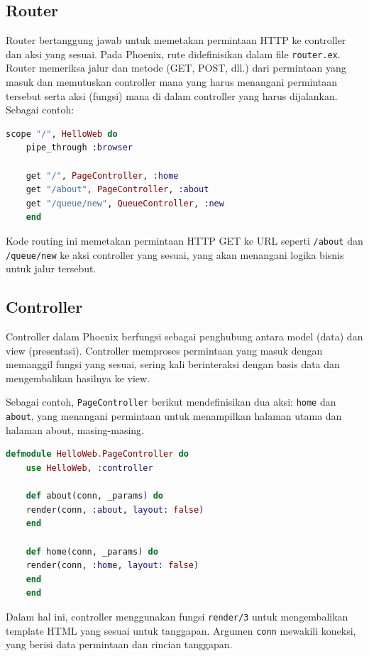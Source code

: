 \subsection{Router}
Router bertanggung jawab untuk memetakan permintaan HTTP ke controller dan aksi yang sesuai. Pada Phoenix, rute didefinisikan dalam file \texttt{router.ex}. Router memeriksa jalur dan metode (GET, POST, dll.) dari permintaan yang masuk dan memutuskan controller mana yang harus menangani permintaan tersebut serta aksi (fungsi) mana di dalam controller yang harus dijalankan. Sebagai contoh:

\begin{lstlisting}[language=Elixir]
	scope "/", HelloWeb do
	pipe_through :browser
	
	get "/", PageController, :home
	get "/about", PageController, :about
	get "/queue/new", QueueController, :new
	end
\end{lstlisting}

Kode routing ini memetakan permintaan HTTP GET ke URL seperti \texttt{/about} dan \texttt{/queue/new} ke aksi controller yang sesuai, yang akan menangani logika bisnis untuk jalur tersebut.

\subsection{Controller}
Controller dalam Phoenix berfungsi sebagai penghubung antara model (data) dan view (presentasi). Controller memproses permintaan yang masuk dengan memanggil fungsi yang sesuai, sering kali berinteraksi dengan basis data dan mengembalikan hasilnya ke view.

Sebagai contoh, \texttt{PageController} berikut mendefinisikan dua aksi: \texttt{home} dan \texttt{about}, yang menangani permintaan untuk menampilkan halaman utama dan halaman about, masing-masing.

\begin{lstlisting}[language=Elixir]
	defmodule HelloWeb.PageController do
	use HelloWeb, :controller
	
	def about(conn, _params) do
	render(conn, :about, layout: false)
	end
	
	def home(conn, _params) do
	render(conn, :home, layout: false)
	end
	end
\end{lstlisting}

Dalam hal ini, controller menggunakan fungsi \texttt{render/3} untuk mengembalikan template HTML yang sesuai untuk tanggapan. Argumen \texttt{conn} mewakili koneksi, yang berisi data permintaan dan rincian tanggapan.

